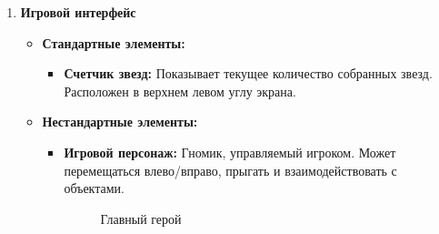 \documentclass{article}
\begin{document}
\begin{enumerate}
    \item \textbf{Игровой интерфейс}
    \begin{itemize}
        \item \textbf{Стандартные элементы:}
        \begin{itemize}
            \item \textbf{Счетчик звезд:} Показывает текущее количество собранных звезд. Расположен в верхнем левом углу экрана.
        \end{itemize}
        \item \textbf{Нестандартные элементы:}
        \begin{itemize}
            \item \textbf{Игровой персонаж:} Гномик, управляемый игроком. Может перемещаться влево/вправо, прыгать и взаимодействовать с объектами. 
    
            \begin{figure}[h]
            \caption{Главный герой}
            \label{ris:image}
            \end{figure}
    

\end{itemize}
\end{itemize}
\end{enumerate}
\end{document}
